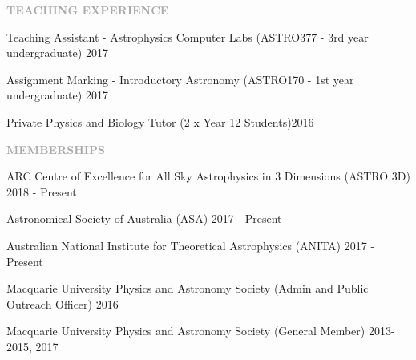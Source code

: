 \documentclass[11pt]{extarticle}
\def\Vhrulefill{{\color{BurntOrange}{\leavevmode\leaders\hrule height 1.2ex depth \dimexpr0.5pt-0.9ex\hfill\kern5pt}}}
\begin{document}
\vspace{3ex}
\noindent
\textcolor{darkgray}{\Large\normalfont\bfseries\MakeUppercase{Teaching Experience}} \Vhrulefill
\vspace{2ex}

\noindent
Teaching Assistant - Astrophysics Computer Labs (ASTRO377 - 3rd year undergraduate) \hfill 2017 \par
\noindent
Assignment Marking - Introductory Astronomy (ASTRO170 - 1st year undergraduate) \hfill 2017 \par
\noindent
Private Physics and Biology Tutor (2 x Year 12 Students)\hfill 2016 \par


\vspace{3ex}
\noindent
\textcolor{darkgray}{\Large\normalfont\bfseries\MakeUppercase{Memberships}} \Vhrulefill
\vspace{2ex}

\noindent
ARC Centre of Excellence for All Sky Astrophysics in 3 Dimensions (ASTRO 3D) \hfill 2018 - Present \par
\noindent
Astronomical Society of Australia (ASA)  \hfill 2017 - Present \par
\noindent
Australian National Institute for Theoretical Astrophysics (ANITA) \hfill 2017 - Present \par
\noindent
Macquarie University Physics and Astronomy Society (Admin and Public Outreach Officer) \hfill 2016 \par
\noindent
Macquarie University Physics and Astronomy Society (General Member) \hfill 2013-2015, 2017 \par



\end{document}
